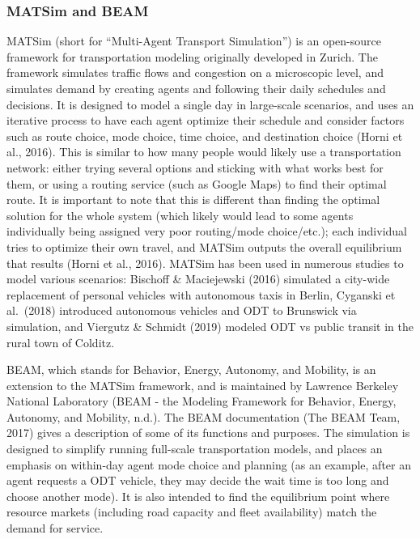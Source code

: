 \documentclass[
]{article}
\begin{document}
\hypertarget{matsim-and-beam}{%
\subsubsection{MATSim and BEAM}\label{matsim-and-beam}}

MATSim (short for ``Multi-Agent Transport Simulation'') is an open-source framework for transportation modeling originally developed in Zurich. The framework simulates traffic flows and congestion on a microscopic level, and simulates demand by creating agents and following their daily schedules and decisions. It is designed to model a single day in large-scale scenarios, and uses an iterative process to have each agent optimize their schedule and consider factors such as route choice, mode choice, time choice, and destination choice (Horni et al., 2016). This is similar to how many people would likely use a transportation network: either trying several options and sticking with what works best for them, or using a routing service (such as Google Maps) to find their optimal route. It is important to note that this is different than finding the optimal solution for the whole system (which likely would lead to some agents individually being assigned very poor routing/mode choice/etc.); each individual tries to optimize their own travel, and MATSim outputs the overall equilibrium that results (Horni et al., 2016). MATSim has been used in numerous studies to model various scenarios: Bischoff \& Maciejewski (2016) simulated a city-wide replacement of personal vehicles with autonomous taxis in Berlin, Cyganski et al.~(2018) introduced autonomous vehicles and ODT to Brunswick via simulation, and Viergutz \& Schmidt (2019) modeled ODT vs public transit in the rural town of Colditz.

BEAM, which stands for Behavior, Energy, Autonomy, and Mobility, is an extension to the MATSim framework, and is maintained by Lawrence Berkeley National Laboratory (BEAM - the Modeling Framework for Behavior, Energy, Autonomy, and Mobility, n.d.). The BEAM documentation (The BEAM Team, 2017) gives a description of some of its functions and purposes. The simulation is designed to simplify running full-scale transportation models, and places an emphasis on within-day agent mode choice and planning (as an example, after an agent requests a ODT vehicle, they may decide the wait time is too long and choose another mode). It is also intended to find the equilibrium point where resource markets (including road capacity and fleet availability) match the demand for service.
\end{document}
